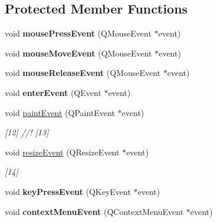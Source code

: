 \subsection*{Protected Member Functions}
\begin{DoxyCompactItemize}
\item 
\hypertarget{class_scribble_area_a7646e72c61ec6a1eeda468fb6dfa66f1}{void {\bfseries mouse\-Press\-Event} (Q\-Mouse\-Event $\ast$event)}\label{class_scribble_area_a7646e72c61ec6a1eeda468fb6dfa66f1}

\item 
\hypertarget{class_scribble_area_ae98981b6c07de07afdc39d57810e945b}{void {\bfseries mouse\-Move\-Event} (Q\-Mouse\-Event $\ast$event)}\label{class_scribble_area_ae98981b6c07de07afdc39d57810e945b}

\item 
\hypertarget{class_scribble_area_a991eb6ab4ac21895973bc9d81b84a30e}{void {\bfseries mouse\-Release\-Event} (Q\-Mouse\-Event $\ast$event)}\label{class_scribble_area_a991eb6ab4ac21895973bc9d81b84a30e}

\item 
\hypertarget{class_scribble_area_abf143b77fc6dac887cd71ce7488fa804}{void {\bfseries enter\-Event} (Q\-Event $\ast$event)}\label{class_scribble_area_abf143b77fc6dac887cd71ce7488fa804}

\item 
void \hyperlink{class_scribble_area_a126a30e3659f6c1cdc202f10fce7e5d9}{paint\-Event} (Q\-Paint\-Event $\ast$event)
\begin{DoxyCompactList}\small\item\em \mbox{[}12\mbox{]} //! \mbox{[}13\mbox{]} \end{DoxyCompactList}\item 
void \hyperlink{class_scribble_area_aaf6be24625a5f0fe1e4a3b8eecb07575}{resize\-Event} (Q\-Resize\-Event $\ast$event)
\begin{DoxyCompactList}\small\item\em \mbox{[}14\mbox{]} \end{DoxyCompactList}\item 
\hypertarget{class_scribble_area_a3ed554609fd0eb635760ab75abe81479}{void {\bfseries key\-Press\-Event} (Q\-Key\-Event $\ast$event)}\label{class_scribble_area_a3ed554609fd0eb635760ab75abe81479}

\item 
\hypertarget{class_scribble_area_ace1abdc60eb03298dbcc1de3833bd80a}{void {\bfseries context\-Menu\-Event} (Q\-Context\-Menu\-Event $\ast$event)}\label{class_scribble_area_ace1abdc60eb03298dbcc1de3833bd80a}

\end{DoxyCompactItemize}


